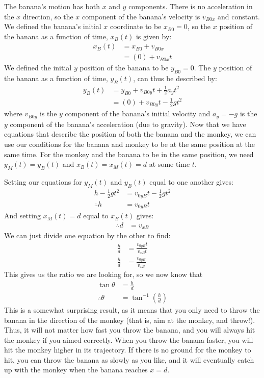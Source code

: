 \begin{example}
The banana's motion has both $x$ and $y$ components. There is no acceleration in the $x$ direction, so the $x$ component of the banana's velocity is $v_{B0x}$ and constant. We defined the banana's initial $x$ coordinate to be $x_{B0}=0$, so the $x$ position of the banana as a function of time, $x_B(t)$ is given by:
\begin{align*}
x_B(t)&=x_{B0}+v_{B0x}\\
&=(0)+v_{B0x}t
\end{align*}
We defined the initial $y$ position of the banana to be $y_{B0}=0$. The $y$ position of the banana as a function of time, $y_B(t)$, can thus be described by:
\begin{align*}
y_B(t)&=y_{B0}+v_{B0y}t+\frac{1}{2}a_yt^2\\
&=(0)+v_{B0y}t-\frac{1}{2}gt^2
\end{align*}
where $v_{B0y}$ is the $y$ component of the banana's initial velocity and $a_y=-g$ is the $y$ component of the banana's acceleration (due to gravity). Now that we have equations that describe the position of both the banana and the monkey, we can use our conditions for the banana and monkey to be at the same position at the same time. For the monkey and the banana to be in the same position, we need $y_M(t)=y_B(t)$ and $x_B(t)=x_M(t) =d$ at some time $t$.

Setting our equations for $y_M(t)$ and $y_B(t)$ equal to one another gives:
\begin{align*}
h-\frac{1}{2} gt^2&=v_{0yB}t-\frac{1}{2}gt^2\\
\therefore h&=v_{0yB}t
\end{align*}
And setting $x_M(t)=d$ equal to $x_B(t)$ gives:
\begin{align*}
\therefore d&=v_{xB}
\end{align*} 
We can just divide one equation by the other to find:
\begin{align*}
\frac{h}{d}&=\frac{v_{0yB}t}{v_{xB}t}\\
\frac{h}{d}&=\frac{v_{0yB}}{v_{xB}}
\end{align*}
This gives us the ratio we are looking for, so we now know that
\begin{align*}
\tan\theta&=\frac{h}{d}\\
\therefore \theta&=\tan^{-1}\left(\frac{h}{d}\right)
\end{align*}
This is a somewhat surprising result, as it means that you only need to throw the banana in the direction of the monkey (that is, aim at the monkey, and throw!). Thus, it will not matter how fast you throw the banana, and you will always hit the monkey if you aimed correctly. When you throw the banana faster, you will hit the monkey higher in its trajectory. If there is no ground for the monkey to hit, you can throw the banana as slowly as you like, and it will eventually catch up with the monkey when the banana reaches $x=d$.
\end{example} 

